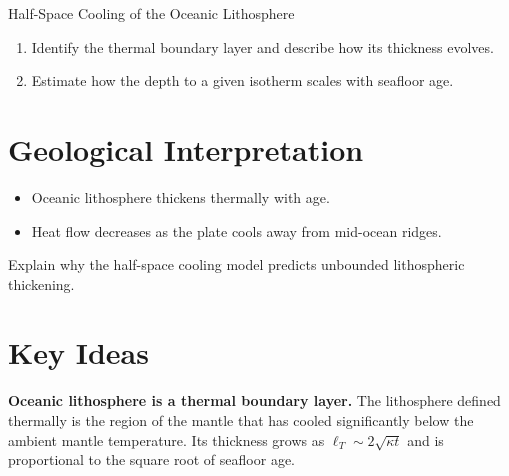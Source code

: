 \begin{activity}{Half-Space Cooling of the Oceanic Lithosphere}
\begin{enumerate}
  \item Identify the thermal boundary layer and describe how its thickness evolves.
  \answerbox[2cm]

  \item Estimate how the depth to a given isotherm scales with seafloor age.
  \answerbox[3cm]
\end{enumerate}

\section*{Geological Interpretation}
\begin{itemize}
  \item Oceanic lithosphere thickens thermally with age.
  \item Heat flow decreases as the plate cools away from mid-ocean ridges.
\end{itemize}

Explain why the half-space cooling model predicts unbounded lithospheric thickening.
\answerbox[3cm]

{\color{red}
\section*{Key Ideas}

{\color{blue}
\textbf{Oceanic lithosphere is a thermal boundary layer.} The lithosphere defined thermally is the region of the mantle that has cooled significantly below the ambient mantle temperature. Its thickness grows as $\ell_T \sim 2\sqrt{\kappa t}$ and is proportional to the square root of seafloor age.

\begin{figure}[h]
\centering
{}
\end{figure}}}
\end{activity}
